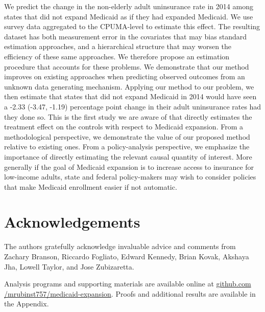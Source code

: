 \documentclass[aoas]{imsart}
\theoremstyle{plain}
\theoremstyle{remark}
\begin{document}
We predict the change in the non-elderly adult uninsurance rate in 2014 among states that did not expand Medicaid as if they had expanded Medicaid. We use survey data aggregated to the CPUMA-level to estimate this effect. The resulting dataset has both measurement error in the covariates that may bias standard estimation approaches, and a hierarchical structure that may worsen the efficiency of these same approaches. We therefore propose an estimation procedure that accounts for these problems. We demonstrate that our method improves on existing approaches when predicting observed outcomes from an unknown data generating mechanism. Applying our method to our problem, we then estimate that states that did not expand Medicaid in 2014 would have seen a -2.33 (-3.47, -1.19) percentage point change in their adult uninsurance rates had they done so. This is the first study we are aware of that directly estimates the treatment effect on the controls with respect to Medicaid expansion. From a methodological perspective, we demonstrate the value of our proposed method relative to existing ones. From a policy-analysis perspective, we emphasize the importance of directly estimating the relevant causal quantity of interest. More generally if the goal of Medicaid expansion is to increase access to insurance for low-income adults, state and federal policy-makers may wish to consider policies that make Medicaid enrollment easier if not automatic.

\section*{Acknowledgements}

The authors gratefully acknowledge invaluable advice and comments from Zachary Branson, Riccardo Fogliato, Edward Kennedy, Brian Kovak, Akshaya Jha, Lowell Taylor, and Jose Zubizaretta.

\begin{supplement}
Analysis programs and supporting materials are available online at \url{github.com /mrubinst757/medicaid-expansion}. Proofs and additional results are available in the Appendix.
\end{supplement}


\clearpage

\appendix



\clearpage



\clearpage



\clearpage



\clearpage



%


\end{document}
